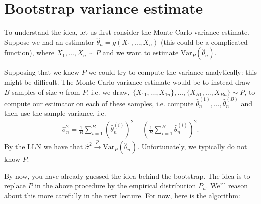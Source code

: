 \documentclass[twoside,12pt]{article}
\newcommand{\cprob}{\overset{p}{\rightarrow}}
\begin{document}
\section{Bootstrap variance estimate}
To understand the idea, let us first consider the Monte-Carlo variance estimate. Suppose we had an estimator $\widehat{\theta}_n = g(X_1,\ldots,X_n)$ (this could be a complicated function), where $X_1,\ldots,X_n \sim P$ and we want to estimate $\text{Var}_P(\widehat{\theta}_n)$. 

Supposing that we knew $P$ we could try to compute the variance analytically: this might be difficult. The Monte-Carlo variance estimate would be to instead draw $B$ samples of size $n$ from $P$, i.e. we draw,
$\{X_{11}, \ldots, X_{1n}\}, \ldots, \{X_{B1},\ldots,X_{Bn}\} \sim P$, to compute our estimator on each of these samples, i.e. compute $\widehat{\theta}_n^{(1)}, \ldots, \widehat{\theta}_n^{(B)}$ and then use the sample variance, i.e.
\begin{align*}
\widehat{\sigma}_n^2 = \frac{1}{B} \sum_{i=1}^B \left(\widehat{\theta}_n^{(i)}\right)^2 -\left( \frac{1}{B} \sum_{i=1}^B \widehat{\theta}_n^{(i)}\right)^2.
\end{align*}
By the LLN we have that $\widehat{\sigma}^2 \cprob \text{Var}_P(\widehat{\theta}_n)$.
Unfortunately, we typically do not know $P$.

By now, you have already guessed the idea behind the bootstrap. The idea is to replace $P$ in the above procedure by the empirical distribution $P_n$. We'll reason about this more carefully in the next lecture. For now, here is the algorithm:

\end{document}
